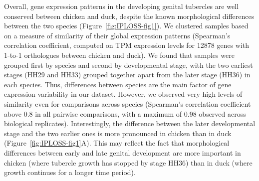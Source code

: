 Overall, gene expression patterns in the developing genital tubercles are well conserved between chicken and duck, despite the known morphological differences between the two species (Figure~\ref{fig:IPLOSS-fig1}). We clustered samples based on a measure of similarity of their global expression patterns (Spearman's correlation coefficient, computed on TPM expression levels for 12878 genes with 1-to-1 orthologues between chicken and duck). We found that samples were grouped first by species and second by developmental stage, with the two earliest stages (HH29 and HH33) grouped together apart from the later stage (HH36) in each species. Thus, differences between species are the main factor of gene expression variability in our dataset. However, we observed very high levels of similarity even for comparisons across species (Spearman's correlation coefficient above 0.8 in all pairwise comparisons, with a maximum of 0.98 observed across biological replicates). Interestingly, the difference between the later developmental stage and the two earlier ones is more pronounced in chicken than in duck (Figure~\ref{fig:IPLOSS-fig1}A). This may reflect the fact that morphological differences between early and late genital development are more important in chicken (where tubercle growth has stopped by stage HH36) than in duck (where growth continues for a longer time period).\\

